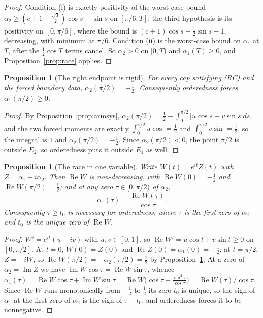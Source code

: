 \documentclass[11pt]{article}
\newtheorem{proposition}[theorem]{Proposition}
\theoremstyle{definition}
\begin{document}
\begin{proof}
Condition (i) is exactly positivity of the worst-case bound
$\alpha_2\ge(c+1-\tfrac{\sqrt3}2)\cos s-\sin s$ on $[\pi/6,T]$; the third hypothesis is its
positivity on $[0,\pi/6]$, where the bound is $(c+1)\cos s-\tfrac12\sin s-1$, decreasing,
with minimum at $\pi/6$. Condition (ii) is the worst-case bound on $\alpha_1$ at $T$, after
the $\tfrac12\cos T$ terms cancel. So $\alpha_2>0$ on $[0,T)$ and $\alpha_1(T)\ge0$, and
Proposition~\ref{prop:race} applies.
\end{proof}

\begin{proposition}[The right endpoint is rigid]\label{prop:rigid}
For every cap satisfying (RC) and the forced boundary data, $\alpha_2(\pi/2)=-\tfrac12$.
Consequently orderedness forces $\alpha_1(\pi/2)\ge0$.
\end{proposition}

\begin{proof}
By Proposition~\ref{prop:armsys},
$\alpha_2(\pi/2)=\tfrac12-\int_0^{\pi/2}\bigl[u\cos s+v\sin s\bigr]ds$, and the two forced
moments are exactly $\int_0^{\pi/2}u\cos=\tfrac12$ and $\int_0^{\pi/2}v\sin=\tfrac12$, so
the integral is $1$ and $\alpha_2(\pi/2)=-\tfrac12$. Since $\alpha_2(\pi/2)<0$, the point
$\pi/2$ is outside $E_2$, so orderedness puts it outside $E_1$ as well.
\end{proof}

\begin{proposition}[The race in one variable]\label{prop:onevar}
Write $W(t)=e^{it}Z(t)$ with $Z=\alpha_1+i\alpha_2$. Then $\operatorname{Re}W$ is
non-decreasing, with $\operatorname{Re}W(0)=-\tfrac12$ and
$\operatorname{Re}W(\pi/2)=\tfrac12$; and at any zero $\tau\in[0,\pi/2)$ of $\alpha_2$,
\[
  \alpha_1(\tau)=\frac{\operatorname{Re}W(\tau)}{\cos\tau} .
\]
Consequently $\tau\ge t_0$ is \emph{necessary} for orderedness, where $\tau$ is the first
zero of $\alpha_2$ and $t_0$ is the unique zero of $\operatorname{Re}W$.
\end{proposition}

\begin{proof}
$W'=e^{it}(u-iv)$ with $u,v\in[0,1]$, so
$\operatorname{Re}W'=u\cos t+v\sin t\ge0$ on $[0,\pi/2]$. At $t=0$,
$W(0)=Z(0)$ and $\operatorname{Re}Z(0)=\alpha_1(0)=-\tfrac12$; at $t=\pi/2$,
$Z=-iW$, so $\operatorname{Re}W(\pi/2)=-\alpha_2(\pi/2)=\tfrac12$ by
Proposition~\ref{prop:rigid}. At a zero of $\alpha_2=\operatorname{Im}Z$ we have
$\operatorname{Im}W\cos\tau=\operatorname{Re}W\sin\tau$, whence
$\alpha_1(\tau)=\operatorname{Re}W\cos\tau+\operatorname{Im}W\sin\tau
=\operatorname{Re}W\bigl(\cos\tau+\tfrac{\sin^2\tau}{\cos\tau}\bigr)
=\operatorname{Re}W(\tau)/\cos\tau$. Since $\operatorname{Re}W$ runs monotonically from
$-\tfrac12$ to $\tfrac12$ its zero $t_0$ is unique, so the sign of $\alpha_1$ at the first
zero of $\alpha_2$ is the sign of $\tau-t_0$, and orderedness forces it to be nonnegative.
\end{proof}
\end{document}
